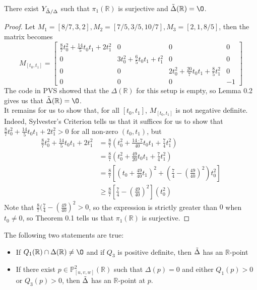 \documentclass{article}
\newcommand{\Rbb}{\mathbb{R}}
\newcommand{\Pbb}{\mathbb{P}}
\begin{document}
\begin{proposition}
There exist $Y_{\Tilde{\Delta}/\Delta}$ such that $\pi_1(\Rbb)$ is surjective and $\Tilde{\Delta}(\Rbb) = \O$.
\end{proposition}

\begin{proof}
Let $M_1 = [8/7, 3, 2], M_2 = [7/5, 3/5, 10/7], M_3 = [2, 1, 8/5]$, then the matrix becomes
\[M_{[t_0, t_1]} = \begin{bmatrix} \frac{8}{7} t_0^2 + \frac{14}{5} t_0 t_1 + 2 t_1^2 & 0 & 0 & 0\\
0 & 3t_0^2 + \frac{6}{5}t_0t_1 + t_1^2 & 0 & 0\\
0 & 0 & 2t_0^2 + \frac{20}{7}t_0t_1 + \frac{8}{5} t_1^2 & 0\\
0 & 0 & 0 & -1
\end{bmatrix}\]
The code in PVS showed that the $\Delta(\Rbb)$ for this setup is empty, so Lemma 0.2 gives us that $\Tilde{\Delta}(\Rbb) = \O$.\\
It remains for us to show that, for all $[t_0, t_1]$, $M_{[t_0, t_1]}$ is not negative definite. Indeed, Sylvester's Criterion tells us that it suffices for us to show that
$\frac{8}{7} t_0^2 + \frac{14}{5} t_0 t_1 + 2 t_1^2 > 0$ for all non-zero $(t_0, t_1)$, but
\begin{align*}
    \frac{8}{7} t_0^2 + \frac{14}{5} t_0 t_1 + 2 t_1^2 &= \frac{8}{7}(t_0^2 + \frac{14 \cdot 7}{40} t_0 t_1 + \frac{7}{4}t_1^2)\\
    &= \frac{8}{7}(t_0^2 + \frac{49}{20}t_0 t_1 + \frac{7}{4}t_1^2)\\
    &= \frac{8}{7}[(t_0 + \frac{49}{40}t_1)^2 + (\frac{7}{4} - (\frac{49}{40})^2)t_0^2] \tag*{Completing the Square}\\
    &\geq \frac{8}{7}[\frac{7}{4} - (\frac{49}{40})^2](t_0^2)
\end{align*}
Note that $\frac{8}{7}(\frac{7}{4} - (\frac{49}{40})^2 > 0$, so the expression is strictly greater than $0$ when $t_0 \neq 0$, so Theorem 0.1 tells us that $\pi_1(\Rbb)$ is surjective.
\end{proof}

\begin{proposition}
The following two statements are true:
\begin{itemize}
    \item If $Q_1(\Rbb) \cap \Delta(\Rbb) \neq \O$ and if $Q_3$ is positive definite, then $\Tilde{\Delta}$ has an $\Rbb$-point
    \item If there exist $p \in \Pbb^2_{[u, v, w]}(\Rbb)$ such that $\Delta(p) = 0$ and either $Q_1(p) > 0$ or $Q_3(p) > 0$, then $\Tilde{\Delta}$ has an $\Rbb$-point at $p$.
\end{itemize}
\end{proposition}
\end{document}
